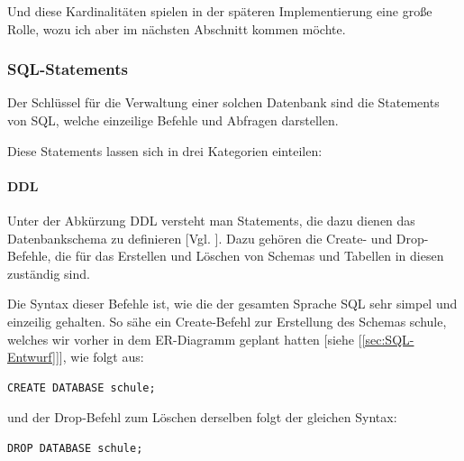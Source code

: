 \documentclass[12pt,a4paper,bibliography=totocnumbered,listof=totocnumbered]{scrartcl}
\begin{document}
Und diese Kardinalitäten spielen in der späteren Implementierung eine große Rolle, wozu ich aber im nächsten Abschnitt kommen möchte.



\subsubsection{SQL-Statements}
Der Schlüssel für die Verwaltung einer solchen Datenbank sind die \glqq Statements\grqq{} von SQL, welche einzeilige Befehle und Abfragen darstellen. 


Diese Statements lassen sich in drei Kategorien einteilen:
\paragraph{DDL}

Unter der Abkürzung DDL versteht man Statements, die dazu dienen das Datenbankschema zu definieren [Vgl. \cite{wiki/SQL}].
Dazu gehören die \glqq Create-\grqq{} und \glqq Drop-Befehle\grqq{}, die für das Erstellen und Löschen von Schemas und Tabellen in diesen zuständig sind.

Die Syntax dieser Befehle ist, wie die der gesamten Sprache SQL sehr simpel und einzeilig gehalten.
So sähe ein \glqq Create-Befehl\grqq{} zur Erstellung des Schemas \glqq schule\grqq{}, welches wir vorher in dem ER-Diagramm geplant hatten [siehe [\ref{sec:SQL-Entwurf}]], wie folgt aus:
\\
\vspace{1em}
\begin{lstlisting}[caption=SQL Create Schema, label=lst:sql-create-schema]
CREATE DATABASE schule;
\end{lstlisting}

und der \glqq Drop-Befehl\grqq{} zum Löschen derselben folgt der gleichen Syntax:
\\
\vspace{1em}
\begin{lstlisting}[caption= SQL Drop Schema, label=lst:sql-drop-schema]
DROP DATABASE schule;
\end{lstlisting}
\end{document}
